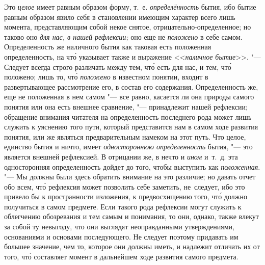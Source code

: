 \label{bkm:bm25a}Это {\em целое} имеет равным образом форму, т.~е.
{\em определённость} бытия, ибо бытие равным образом явило себя в становлении
имеющим характер всего лишь момента, представляющим собой некое снятое,
отрицательно-определенное; но таково
оно {\em для нас, в нашей рефлексии;} оно еще не {\em положено} в себе самом.
Определенность же наличного бытия как таковая есть положенная определенность,
на чт\'{о} указывает также и выражение <<{\em наличное бытие}>>. "--- Следует
всегда строго различать между тем, чт\'{о} есть для нас, и тем, чт\'{о}
положено; лишь то, чт\'{о} {\em положено} в известном понятии, входит в
развертывающее рассмотрение его, в состав его содержания. Определенность же,
еще не положенная в нем самом "--- все равно, касается ли она природы самого
понятия или она есть внешнее сравнение, "--- принадлежит нашей рефлексии;
обращение внимания читателя на определенность последнего рода может лишь
служить к уяснению того пути, который представится нам в самом ходе развития
понятия, или же являться предварительным намеком на этот путь. Что целое,
единство бытия и ничто, имеет {\em одностороннюю определенность} бытия, "---
это является внешней рефлексией. В отрицании же, в нечто и {\em ином} и~т.~д.
эта односторонняя определенность дойдет до того, чтобы выступить как
{\em положенная}. "--- Мы должны были здесь обратить внимание на это различие;
но давать отчет обо всем, чт\'{о} рефлексия может позволить себе заметить,
не~следует, ибо это привело бы к пространности изложения, к предвосхищению
того, чт\'{о} должно получиться в самом предмете. Если такого рода рефлексии
могут служить к облегчению обозревания и тем самым и понимания, то они, однако,
также влекут за собой ту невыгоду, что они выглядят неоправданными
утверждениями, основаниями и основами последующего. Не следует поэтому
придавать им большее значение, чем то, которое они должны иметь, и надлежит
отличать их от того, чт\'{о} составляет момент в дальнейшем ходе развития
самого предмета.


